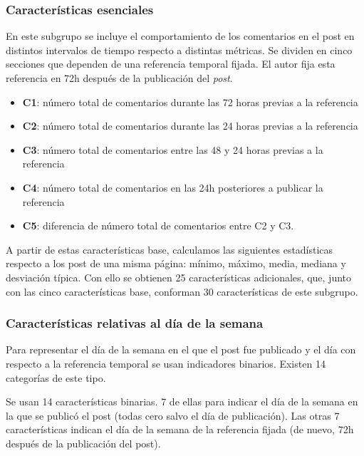 \documentclass[11pt]{article}
\begin{document}
\subsubsection{Características esenciales}

En este subgrupo se incluye el comportamiento de los comentarios en el post en distintos intervalos de tiempo respecto a distintas métricas. Se dividen en cinco secciones que dependen de una referencia temporal fijada. El autor fija esta referencia en 72h después de la publicación del \emph{post}.

\begin{itemize}
  \item \textbf{C1}: número total de comentarios durante las 72 horas previas a la referencia

  \item \textbf{C2}: número total de comentarios durante las  24 horas previas a la referencia

  \item \textbf{C3}: número total de comentarios entre las 48 y 24 horas previas a la referencia

  \item \textbf{C4}: número total de comentarios en las 24h posteriores a publicar la referencia

  \item \textbf{C5}: diferencia de número total de comentarios entre C2 y C3.

\end{itemize}

A partir de estas características base, calculamos las siguientes estadísticas respecto a los post de una misma página:  mínimo, máximo, media, mediana y desviación típica. Con ello se obtienen 25 características adicionales, que, junto con las cinco características base, conforman 30 características de este subgrupo.

\subsubsection{Características relativas al día de la semana}

Para representar el día de la semana en el que el post fue publicado y el día con respecto a la referencia temporal se usan indicadores binarios. Existen 14 categorías de este tipo.

Se usan 14 características binarias. 7 de ellas para indicar el día de la semana en la que se publicó el post (todas cero salvo el día de publicación). Las otras 7 características indican el día de la semana de la referencia fijada (de nuevo, 72h después de la publicación del post).
\end{document}
